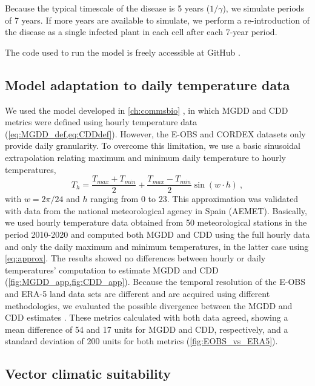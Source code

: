 Because the typical timescale of the disease is 5 years ($1/\gamma$), we
simulate periods of 7 years. If more years are available
to simulate, we perform a re-introduction of the disease as a single infected
plant in each cell after each 7-year period.

The code used to run the model is freely accessible at GitHub
\cite{CODE_2}.

\subsection{Model adaptation to daily temperature data}

We used the model developed in \cref{ch:commsbio}
\cite{GimenezRomero2022_CommsBio}, in which MGDD and CDD metrics were defined
using hourly temperature data (\cref{eq:MGDD_def,eq:CDDdef}). However, the
E-OBS
and CORDEX datasets only provide daily granularity. To overcome this
limitation, we use a basic sinusoidal extrapolation relating maximum and
minimum daily temperature to hourly temperatures,
\begin{equation}\label{eq:approx}
    T_h=\frac{T_{max}+T_{min}}{2} + \frac{T_{max}-T_{min}}{2}\sin(w\cdot h)
    \ ,
\end{equation}
with $w=2\pi/24$ and $h$ ranging from $0$ to $23$. This approximation was
validated with data from the national meteorological agency in Spain (AEMET).
Basically, we used hourly temperature data obtained from 50 meteorological
stations in the period 2010-2020 and computed both MGDD and CDD using the full
hourly data and only the daily maximum and minimum temperatures, in the latter
case using \cref{eq:approx}. The results showed no differences between hourly
or daily temperatures' computation to estimate MGDD and CDD
(\cref{fig:MGDD_app,fig:CDD_app}). Because the temporal resolution
of the E-OBS and ERA-5 land data sets are different and are acquired using
different methodologies, we evaluated the possible divergence between the MGDD
and CDD estimates  \cite{GimenezRomero2022_CommsBio}. These metrics calculated
with both data agreed, showing a mean difference of 54 and 17 units for MGDD
and CDD, respectively, and a standard deviation of 200 units for both metrics
(\cref{fig:EOBS_vs_ERA5}).

\subsection{Vector climatic suitability}

